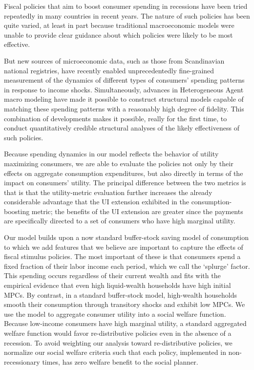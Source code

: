 \documentclass[../HAFiscal]{subfiles}
\begin{document}
Fiscal policies that aim to boost consumer spending in recessions have been tried repeatedly in many countries in recent years.  The nature of such policies has been quite varied, at least in part because traditional macroeconomic models were unable to provide clear guidance about which policies were likely to be most effective.

But new sources of microeconomic data, such as those from Scandinavian national registries, have recently enabled unprecedentedly fine-grained measurement of the dynamics of different types of consumers' spending patterns in response to income shocks.  Simultaneously, advances in Heterogeneous Agent macro modeling have made it possible to construct structural models capable of matching these spending patterns with a reasonably high degree of fidelity.  This combination of developments makes it possible, really for the first time, to conduct quantitatively credible structural analyses of the likely effectiveness of such policies.

Because spending dynamics in our model reflects the behavior of utility maximizing consumers, we are able to evaluate the policies not only by their effects on aggregate consumption expenditures, but also directly in terms of the impact on consumers' utility.  The principal difference between the two metrics is that is that the utility-metric evaluation further increases the already considerable advantage that the UI extension exhibited in the consumption-boosting metric; the benefits of the UI extension are greater since the payments are specifically directed to a set of consumers who have high marginal utility.

Our model builds upon a now standard buffer-stock saving model of consumption to which we add features that we believe are important to capture the effects of fiscal stimulus policies. The most important of these is that consumers spend a fixed fraction of their labor income each period, which we call the `splurge' factor. This spending occurs regardless of their current wealth and fits with the empirical evidence that even high liquid-wealth households have high initial MPCs. By contrast, in a standard buffer-stock model, high-wealth households smooth their consumption through transitory shocks and exhibit low MPCs. We use the model to aggregate consumer utility into a social welfare function. Because low-income consumers have high marginal utility, a standard aggregated welfare function would favor re-distributive policies even in the absence of a recession. To avoid weighting our analysis toward re-distributive policies, we normalize our social welfare criteria such that each policy, implemented in non-recessionary times, has zero welfare benefit to the social planner. 
\end{document}
